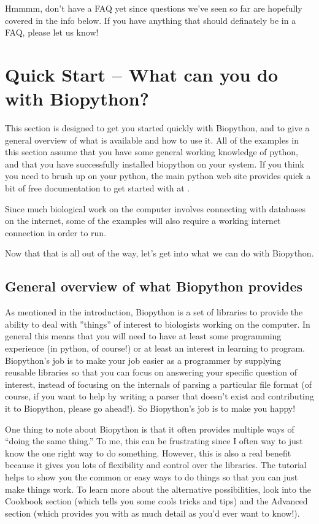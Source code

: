 \documentclass{article}
\begin{document}
Hmmmm, don't have a FAQ yet since questions we've seen so far are hopefully covered in the info below. If you have anything that should definately be in a FAQ, please let us know!

\section{Quick Start -- What can you do with Biopython?}

This section is designed to get you started quickly with Biopython, and to give a general overview of what is available and how to use it. All of the examples in this section assume that you have some general working knowledge of python, and that you have successfully installed biopython on your system. If you think you need to brush up on your python, the main python web site provides quick a bit of free documentation to get started with at . 


Since much biological work on the computer involves connecting with databases on the internet, some of the examples will also require a working internet connection in order to run. 


Now that that is all out of the way, let's get into what we can do with Biopython.

\subsection{General overview of what Biopython provides}

As mentioned in the introduction, Biopython is a set of libraries to provide the ability to deal with ''things'' of interest to biologists working on the computer. In general this means that you will need to have at least some programming experience (in python, of course!) or at least an interest in learning to program. Biopython's job is to make your job easier as a programmer by supplying reusable libraries so that you can focus on answering your specific question of interest, instead of focusing on the internals of parsing a particular file format (of course, if you want to help by writing a parser that doesn't exist and contributing it to Biopython, please go ahead!). So Biopython's job is to make you happy!


One thing to note about Biopython is that it often provides multiple ways of ``doing the same thing.'' To me, this can be frustrating since I  often way to just know the one right way to do something. However, this is also a real benefit because it gives you lots of flexibility and control over the libraries. The tutorial helps to show you the common or easy ways to do things so that you can just make things work. To learn more about the alternative possibilities, look into the Cookbook section (which tells you some cools tricks and tips) and the Advanced section (which provides you with as much detail as you'd ever want to know!). 
\end{document}
